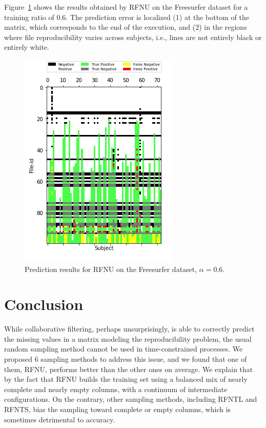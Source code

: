 \documentclass[10pt, conference, compsocconf]{IEEEtran}
\begin{document}
Figure~\ref{fig:error-locality} shows the results obtained by RFNU on 
the Freesurfer dataset for a training ratio of 0.6. The prediction 
error is localized (1) at the bottom of the matrix, which corresponds 
to the end of the execution, and (2) in the regions where file 
reproducibility varies across subjects, i.e., lines are not entirely 
black or entirely white.
\begin{figure}
\centering
\includegraphics[width=0.55\columnwidth]{figures/RFNU_FS100F_ALS_06_test_data_matrix_run1.png}
\caption{Prediction results for RFNU on the Freesurfer dataset, $\alpha=0.6$.}
\label{fig:error-locality}
\end{figure}

\section{Conclusion}

While collaborative filtering, perhaps unsurprisingly, is able to 
correctly predict the missing values in a matrix modeling the 
reproducibility problem, the usual random sampling method cannot be 
used in time-constrained processes. We proposed 6 sampling methods to 
address this issue, and we found that one of them, RFNU, performs 
better than the other ones on average. We 
explain that by the fact that RFNU builds the training set using a 
balanced mix of nearly complete and nearly empty columns, with a 
continuum of 
intermediate configurations. On the contrary, other sampling 
methods, including RFNTL and RFNTS, bias the sampling toward complete 
or empty columns, which is sometimes detrimental to accuracy.
\end{document}
